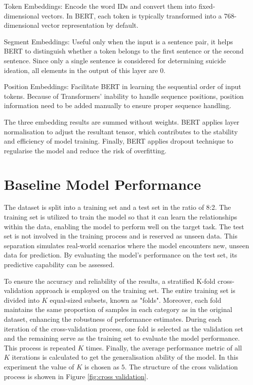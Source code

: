 \documentclass[ %
                    author={Bocheng Wang},
                supervisor={Dr. Qiang Liu},
                    degree={MSc},
                     title={A Research on Identification of Suicide Ideation in Texts with Multiple Models},
                      type={},
                      year={2024}]{dissertation}
\begin{document}
Token Embeddings: Encode the word IDs and convert them into fixed-dimensional vectors. In BERT, each token is typically transformed into a 768-dimensional vector representation by default.

Segment Embeddings: Useful only when the input is a sentence pair, it helps BERT to distinguish whether a token belongs to the first sentence or the second sentence. Since only a single sentence is considered for determining suicide ideation, all elements in the output of this layer are $0$.

Position Embeddings: Facilitate BERT in learning the sequential order of input tokens. Because of Transformers' inability to handle sequence positions, position information need to be added manually to ensure proper sequence handling.

The three embedding results are summed without weights. BERT applies layer normalisation to adjust the resultant tensor\cite{pymars2020normalisation}, which contributes to the stability and efficiency of model training. Finally, BERT applies dropout technique to regularise the model and reduce the risk of overfitting.

\section{Baseline Model Performance}
\noindent
The dataset is split into a training set and a test set in the ratio of 8:2. The training set is utilized to train the model so that it can learn the relationships within the data, enabling the model to perform well on the target task. The test set is not involved in the training process and is reserved as unseen data. This separation simulates real-world scenarios where the model encounters new, unseen data for prediction. By evaluating the model's performance on the test set, its predictive capability can be assessed.

To ensure the accuracy and reliability of the results, a stratified K-fold cross-validation approach is employed on the training set\cite{browne2000cross}. The entire training set is divided into $K$ equal-sized subsets, known as "folds". Moreover, each fold maintains the same proportion of samples in each category as in the original dataset, enhancing the robustness of performance estimates. During each iteration of the cross-validation process, one fold is selected as the validation set and the remaining serve as the training set to evaluate the model performance. This process is repeated $K$ times. Finally, the average performance metric of all $K$ iterations is calculated to get the generalisation ability of the model. In this experiment the value of $K$ is chosen as $5$. The structure of the cross validation process is showen in Figure \ref{fig:cross validation}.
\end{document}
